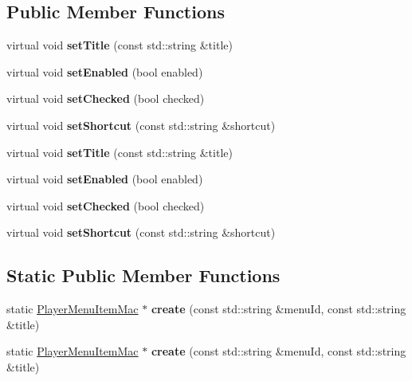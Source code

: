 \subsection*{Public Member Functions}
\begin{DoxyCompactItemize}
\item 
\mbox{\label{classPlayerMenuItemMac_ac0799a22365d45d27fa64bd7beb4e887}} 
virtual void {\bfseries set\+Title} (const std\+::string \&title)
\item 
\mbox{\label{classPlayerMenuItemMac_a5a4cc9eb149ca61a4470b728fb2fcebd}} 
virtual void {\bfseries set\+Enabled} (bool enabled)
\item 
\mbox{\label{classPlayerMenuItemMac_a8a8e2e31d4b5ec33ea7e7ecbea1f0df7}} 
virtual void {\bfseries set\+Checked} (bool checked)
\item 
\mbox{\label{classPlayerMenuItemMac_a564f44f3310e5fd8889987570fcb262e}} 
virtual void {\bfseries set\+Shortcut} (const std\+::string \&shortcut)
\item 
\mbox{\label{classPlayerMenuItemMac_aa0107387846631520cc51ad2d89fc853}} 
virtual void {\bfseries set\+Title} (const std\+::string \&title)
\item 
\mbox{\label{classPlayerMenuItemMac_a1eca2e786a3f361851aa9dc03868e88a}} 
virtual void {\bfseries set\+Enabled} (bool enabled)
\item 
\mbox{\label{classPlayerMenuItemMac_ad57fb5461735b0913518d8c8b36fa67a}} 
virtual void {\bfseries set\+Checked} (bool checked)
\item 
\mbox{\label{classPlayerMenuItemMac_a75cfd0933e46260aa57868aaaccec0ba}} 
virtual void {\bfseries set\+Shortcut} (const std\+::string \&shortcut)
\end{DoxyCompactItemize}
\subsection*{Static Public Member Functions}
\begin{DoxyCompactItemize}
\item 
\mbox{\label{classPlayerMenuItemMac_a21531ad38b1d95b9a73defe36c566ff7}} 
static \hyperlink{classPlayerMenuItemMac}{Player\+Menu\+Item\+Mac} $\ast$ {\bfseries create} (const std\+::string \&menu\+Id, const std\+::string \&title)
\item 
\mbox{\label{classPlayerMenuItemMac_a29f86c3444b75d8827aa7d4e67b4667b}} 
static \hyperlink{classPlayerMenuItemMac}{Player\+Menu\+Item\+Mac} $\ast$ {\bfseries create} (const std\+::string \&menu\+Id, const std\+::string \&title)
\end{DoxyCompactItemize}
